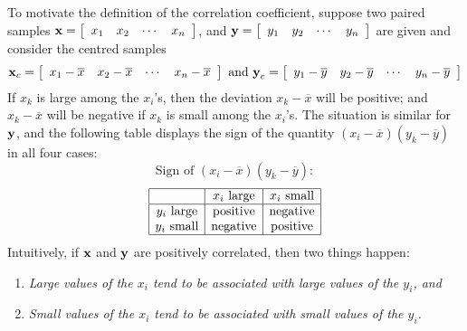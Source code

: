To motivate the definition of the correlation coefficient, suppose two
paired samples \newline$\textbf{x} = 
\left[ \begin{array}{cccc}
x_{1} & x_{2} & \cdots & x_{n}
\end{array} \right]$, and $\textbf{y} = 
\left[ \begin{array}{cccc}
y_{1} & y_{2} & \cdots & y_{n}
\end{array} \right]$ are given and consider the centred samples
\begin{equation*}
\textbf{x}_c = 
\left[ \begin{array}{cccc}
x_1 - \overline{x} &
x_2 - \overline{x} &
\cdots &
x_n - \overline{x} 
\end{array} \right]
\mbox{ and } \textbf{y}_c = 
\left[ \begin{array}{cccc}
y_1 - \overline{y} &
y_2 - \overline{y} &
\cdots &
y_n - \overline{y} 
\end{array} \right]
\end{equation*}
If $x_{k}$ is large among the $x_{i}$'s, then the deviation $x_{k} - \overline{x}$ will be positive; and $x_{k} - \overline{x}$ will be negative if $x_{k}$ is small among the $x_{i}$'s. The situation is similar for $\textbf{y}$, and the following table displays the sign of the quantity $(x_{i} - \overline{x})(y_{k} - \overline{y})$ in all four cases:
\begin{equation*}
\mbox{Sign of }(x_i - \overline{x})(y_k - \overline{y}):
\end{equation*}
\begin{equation*}
\begin{array}{|c|c|c|}
	\hline
	 & x_i \mbox{ large} & x_i \mbox{ small} \\ \hline
	 y_i \mbox{ large} & \mbox{positive} & \mbox{negative} \\
	 y_i \mbox{ small} & \mbox{negative} & \mbox{positive} \\ \hline
\end{array}
\end{equation*}
Intuitively, if $\textbf{x}$ and $\textbf{y}$ are positively correlated, then two things happen:

\begin{enumerate}
\item \textit{Large values of the $x_{i}$ tend to be associated with large values of the $y_{i}$, and}

\item \textit{Small values of the $x_{i}$ tend to be associated with small values of the $y_{i}$.}

\end{enumerate}

